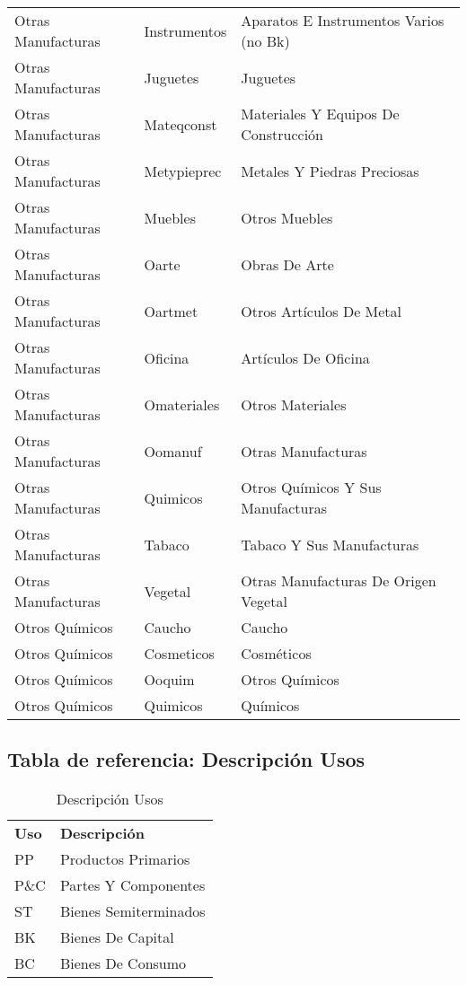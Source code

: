 \documentclass[class=article, crop=false]{standalone}
\begin{document}
\begin{longtable}[!ht]{lll}
	Otras Manufacturas & Instrumentos & Aparatos E Instrumentos Varios (no Bk) \\
	Otras Manufacturas & Juguetes & Juguetes \\
	Otras Manufacturas & Mateqconst & Materiales Y Equipos De Construcción \\
	Otras Manufacturas & Metypieprec & Metales Y Piedras Preciosas \\
	Otras Manufacturas & Muebles & Otros Muebles \\
	Otras Manufacturas & Oarte & Obras De Arte \\
	Otras Manufacturas & Oartmet & Otros Artículos De Metal \\
	Otras Manufacturas & Oficina & Artículos De Oficina \\
	Otras Manufacturas & Omateriales & Otros Materiales \\
	Otras Manufacturas & Oomanuf & Otras Manufacturas \\
	Otras Manufacturas & Quimicos & Otros Químicos Y Sus Manufacturas \\
	Otras Manufacturas & Tabaco & Tabaco Y Sus Manufacturas \\
	Otras Manufacturas & Vegetal & Otras Manufacturas De Origen Vegetal \\
	Otros Químicos & Caucho & Caucho \\
	Otros Químicos & Cosmeticos & Cosméticos \\
	Otros Químicos & Ooquim & Otros Químicos \\
	Otros Químicos & Quimicos & Químicos

\end{longtable}



\subsection{Tabla de referencia: Descripción Usos}


\begin{table}[!ht]
	\begin{tabular}{ll}
		\textbf{Uso} & \textbf{Descripción} \\
		PP & Productos Primarios \\
		P\&C & Partes Y Componentes \\
		ST & Bienes Semiterminados \\
		BK & Bienes De Capital \\
		BC & Bienes De Consumo
	\end{tabular}
\caption{Descripción Usos}
\label{tabla:usos}
\end{table}
\end{document}
